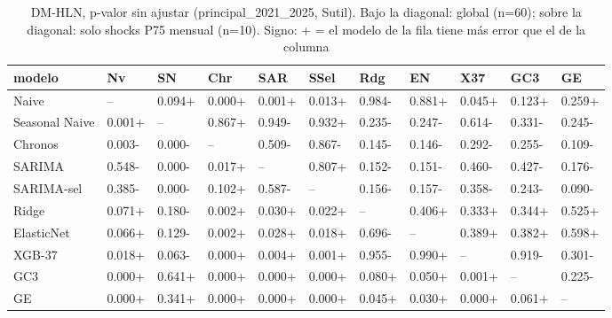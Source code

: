 \begin{table}[H]
\centering
\small
\caption{DM-HLN, p-valor sin ajustar (principal\_2021\_2025, Sutil). Bajo la diagonal: global (n=60); sobre la diagonal: solo shocks P75 mensual (n=10). Signo: + = el modelo de la fila tiene más error que el de la columna}
\label{tab:T09_DM_matriz_principal_2021_2025_sutil}
\begin{tabular}{lllllllllll}
\toprule
modelo & Nv & SN & Chr & SAR & SSel & Rdg & EN & X37 & GC3 & GE \\
\midrule
Naive & -- & 0.094+ & 0.000+ & 0.001+ & 0.013+ & 0.984- & 0.881+ & 0.045+ & 0.123+ & 0.259+ \\
Seasonal Naive & 0.001+ & -- & 0.867+ & 0.949- & 0.932+ & 0.235- & 0.247- & 0.614- & 0.331- & 0.245- \\
Chronos & 0.003- & 0.000- & -- & 0.509- & 0.867- & 0.145- & 0.146- & 0.292- & 0.255- & 0.109- \\
SARIMA & 0.548- & 0.000- & 0.017+ & -- & 0.807+ & 0.152- & 0.151- & 0.460- & 0.427- & 0.176- \\
SARIMA-sel & 0.385- & 0.000- & 0.102+ & 0.587- & -- & 0.156- & 0.157- & 0.358- & 0.243- & 0.090- \\
Ridge & 0.071+ & 0.180- & 0.002+ & 0.030+ & 0.022+ & -- & 0.406+ & 0.333+ & 0.344+ & 0.525+ \\
ElasticNet & 0.066+ & 0.129- & 0.002+ & 0.028+ & 0.018+ & 0.696- & -- & 0.389+ & 0.382+ & 0.598+ \\
XGB-37 & 0.018+ & 0.063- & 0.000+ & 0.004+ & 0.001+ & 0.955- & 0.990+ & -- & 0.919- & 0.301- \\
GC3 & 0.000+ & 0.641+ & 0.000+ & 0.000+ & 0.000+ & 0.080+ & 0.050+ & 0.001+ & -- & 0.225- \\
GE & 0.000+ & 0.341+ & 0.000+ & 0.000+ & 0.000+ & 0.045+ & 0.030+ & 0.000+ & 0.061+ & -- \\
\bottomrule
\end{tabular}
\end{table}